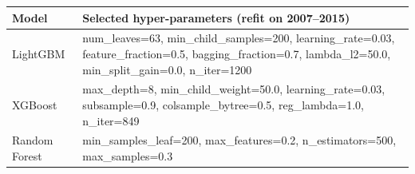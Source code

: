 \begin{tabular}{lp{12cm}}
\toprule
Model & Selected hyper-parameters (refit on 2007--2015) \\
\midrule
LightGBM & num\_leaves=63, min\_child\_samples=200, learning\_rate=0.03, feature\_fraction=0.5, bagging\_fraction=0.7, lambda\_l2=50.0, min\_split\_gain=0.0, n\_iter=1200 \\
XGBoost & max\_depth=8, min\_child\_weight=50.0, learning\_rate=0.03, subsample=0.9, colsample\_bytree=0.5, reg\_lambda=1.0, n\_iter=849 \\
Random Forest & min\_samples\_leaf=200, max\_features=0.2, n\_estimators=500, max\_samples=0.3 \\
\bottomrule
\end{tabular}
